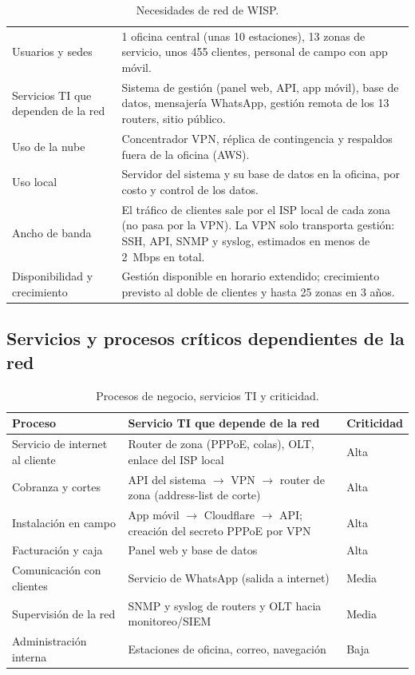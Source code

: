 \begin{table}[htbp]
\centering
\caption{Necesidades de red de WISP.}
\label{tab:ce03-necesidades}
\small
\begin{tabularx}{\textwidth}{L{3.4cm}X}
\toprule
Usuarios y sedes & 1 oficina central (unas 10 estaciones), 13 zonas de servicio, unos 455 clientes, personal de campo con app móvil. \\
Servicios TI que dependen de la red & Sistema de gestión (panel web, API, app móvil), base de datos, mensajería WhatsApp, gestión remota de los 13 routers, sitio público. \\
Uso de la nube & Concentrador VPN, réplica de contingencia y respaldos fuera de la oficina (AWS). \\
Uso local & Servidor del sistema y su base de datos en la oficina, por costo y control de los datos. \\
Ancho de banda & El tráfico de clientes sale por el ISP local de cada zona (no pasa por la VPN). La VPN solo transporta gestión: SSH, API, SNMP y syslog, estimados en menos de 2~Mbps en total. \\
Disponibilidad y crecimiento & Gestión disponible en horario extendido; crecimiento previsto al doble de clientes y hasta 25 zonas en 3 años. \\
\bottomrule
\end{tabularx}
\end{table}

\subsection{Servicios y procesos críticos dependientes de la red}

\begin{table}[H]
\centering
\caption{Procesos de negocio, servicios TI y criticidad.}
\label{tab:ce03-procesos}
\small
\begin{tabularx}{\textwidth}{L{3.6cm}XL{1.6cm}}
\toprule
\textbf{Proceso} & \textbf{Servicio TI que depende de la red} & \textbf{Criticidad} \\
\midrule
Servicio de internet al cliente & Router de zona (PPPoE, colas), OLT, enlace del ISP local & Alta \\
Cobranza y cortes & API del sistema $\rightarrow$ VPN $\rightarrow$ router de zona (address-list de corte) & Alta \\
Instalación en campo & App móvil $\rightarrow$ Cloudflare $\rightarrow$ API; creación del secreto PPPoE por VPN & Alta \\
Facturación y caja & Panel web y base de datos & Alta \\
Comunicación con clientes & Servicio de WhatsApp (salida a internet) & Media \\
Supervisión de la red & SNMP y syslog de routers y OLT hacia monitoreo/SIEM & Media \\
Administración interna & Estaciones de oficina, correo, navegación & Baja \\
\bottomrule
\end{tabularx}
\end{table}

